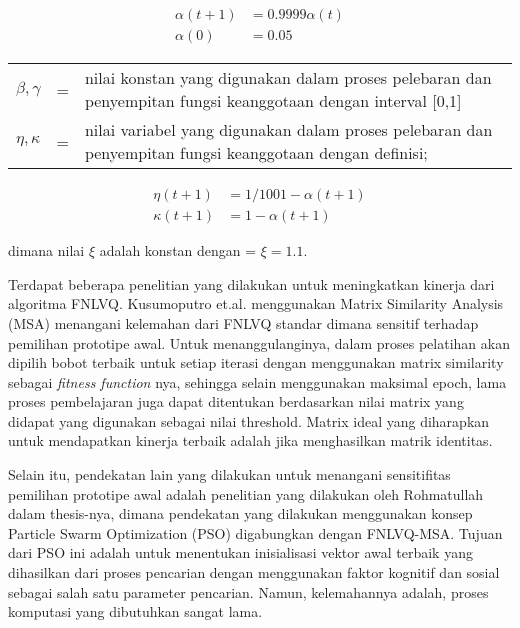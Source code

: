 \begin{small}
	\begin{align}\label{eq:learning_rate}
		\alpha(t+1) &= 0.9999 \alpha(t) \\[0.2cm]
		\alpha(0) &= 0.05 \nonumber
	\end{align}
\end{small}

\begin{tabular}{llp{}}
$\beta, \gamma$ &=& nilai konstan yang digunakan dalam proses pelebaran
dan penyempitan fungsi keanggotaan dengan interval [0,1] \\
$\eta, \kappa$ &=& nilai variabel yang digunakan dalam proses pelebaran
dan penyempitan fungsi keanggotaan dengan definisi;
\end{tabular}

\begin{small}
	\begin{align}\label{eq:fuzziness_value}
	\eta(t+1) &= 1/100 {1-\alpha(t+1)} \\[0.2cm]
	\kappa(t+1) &= 1 - \alpha(t+1) \nonumber
	\end{align}
\end{small}

\noindent dimana nilai $\xi$ adalah konstan dengan = $\xi=1.1$.

Terdapat beberapa penelitian yang dilakukan untuk meningkatkan
kinerja dari algoritma FNLVQ. Kusumoputro et.al. \cite{Kusumoputro:2002b} 
menggunakan Matrix Similarity Analysis (MSA) menangani kelemahan dari FNLVQ
standar dimana sensitif terhadap pemilihan prototipe awal. Untuk
menanggulanginya, dalam proses pelatihan akan dipilih bobot terbaik untuk
setiap iterasi dengan menggunakan matrix similarity sebagai  \emph{fitness
function} nya, sehingga selain menggunakan maksimal epoch, lama proses
pembelajaran juga dapat ditentukan berdasarkan nilai matrix yang didapat 
yang digunakan sebagai nilai threshold. Matrix ideal yang diharapkan untuk 
mendapatkan kinerja terbaik adalah jika menghasilkan matrik identitas.

Selain itu, pendekatan lain yang dilakukan untuk menangani
sensitifitas pemilihan prototipe awal adalah penelitian yang
dilakukan oleh Rohmatullah dalam thesis-nya, dimana pendekatan yang dilakukan
menggunakan konsep Particle Swarm Optimization (PSO) digabungkan dengan
FNLVQ-MSA. Tujuan dari PSO ini adalah untuk menentukan inisialisasi vektor awal
terbaik yang dihasilkan dari proses pencarian dengan menggunakan faktor kognitif
dan sosial sebagai salah satu parameter pencarian. Namun, kelemahannya adalah,
proses komputasi yang dibutuhkan sangat lama.

% 












